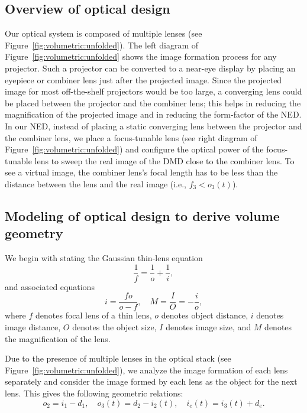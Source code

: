 
\subsection{Overview of optical design} 
Our optical system is composed of multiple lenses (see Figure~\ref{fig:volumetric:unfolded}). The left diagram of Figure~\ref{fig:volumetric:unfolded} shows the image formation process for any projector. Such a projector can be converted to a near-eye display by placing an eyepiece or combiner lens just after the projected image. Since the projected image for most off-the-shelf projectors would be too large, a converging lens could be placed between the projector and the combiner lens; this helps in reducing the magnification of the projected image and in reducing the form-factor of the NED. In our NED, instead of placing a static converging lens between the projector and the combiner lens, we place a focus-tunable lens (see right diagram of Figure~\ref{fig:volumetric:unfolded}) and configure the optical power of the focus-tunable lens to sweep the real image of the DMD close to the combiner lens. To see a virtual image, the combiner lens's focal length has to be less than the distance between the lens and the real image (i.e., $f_3 < o_3(t)$).

\subsection{Modeling of optical design to derive volume geometry}
We begin with stating the Gaussian thin-lens equation
\begin{equation}
\frac{1}{f} = \frac{1}{o} + \frac{1}{i},
\label{eq:basic_optics_equation}
\end{equation}
and associated equations
\begin{equation}
i = \frac{f o}{o - f},\quad M = \frac{I}{O} = -\frac{i}{o},
\label{eq:basic_optics_equation_2}
\end{equation}
where $f$ denotes focal lens of a thin lens, $o$ denotes object distance, $i$ denotes image distance, $O$ denotes the object size, $I$ denotes image size, and $M$ denotes the magnification of the lens.

Due to the presence of multiple lenses in the optical stack (see Figure~\ref{fig:volumetric:unfolded}), we analyze the image formation of each lens separately and consider the image formed by each lens as the object for the next lens. This gives the following geometric relations:
\begin{equation}
o_2 = i_1-d_1, \quad o_3(t) = d_2 - i_2(t), \quad i_e(t) = i_3(t) + d_e.
\label{eq:geometric_relations}
\end{equation}

